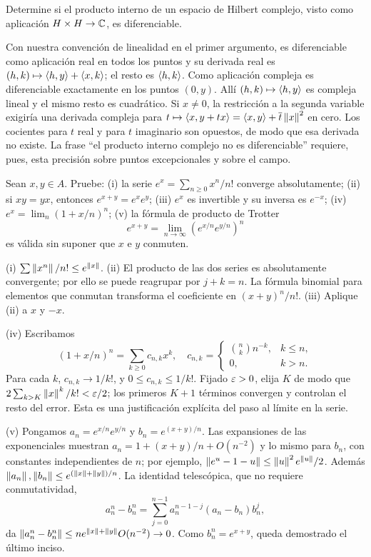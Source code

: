 \begin{ejercicio}\label{ej:v3-l21-2}
Determine si el producto interno de un espacio de Hilbert complejo, visto como aplicación $H\times H\to\mathbb C$, es diferenciable.
\end{ejercicio}
\begin{solucion}
Con nuestra convención de linealidad en el primer argumento, es diferenciable como aplicación real en todos los puntos y su derivada real es $(h,k)\mapsto\left\langle h,y\right\rangle+\left\langle x,k\right\rangle$; el resto es $\left\langle h,k\right\rangle$. Como aplicación compleja es diferenciable exactamente en los puntos $(0,y)$. Allí $(h,k)\mapsto\left\langle h,y\right\rangle$ es compleja lineal y el mismo resto es cuadrático. Si $x\ne0$, la restricción a la segunda variable exigiría una derivada compleja para $t\mapsto\left\langle x,y+tx\right\rangle=\left\langle x,y\right\rangle+\overline t\left\lVert x\right\rVert^2$ en cero. Los cocientes para $t$ real y para $t$ imaginario son opuestos, de modo que esa derivada no existe. La frase ``el producto interno complejo no es diferenciable'' requiere, pues, esta precisión sobre puntos excepcionales y sobre el campo.
\end{solucion}

\begin{ejercicio}\label{ej:v3-l21-3}
Sean $x,y\in A$. Pruebe: (i) la serie $e^x=\sum_{n\ge0}x^n/n!$ converge absolutamente; (ii) si $xy=yx$, entonces $e^{x+y}=e^xe^y$; (iii) $e^x$ es invertible y su inversa es $e^{-x}$; (iv) $e^x=\lim_n(1+x/n)^n$; (v) la fórmula de producto de Trotter
\[
 e^{x+y}=\lim_{n\to\infty}(e^{x/n}e^{y/n})^n
\]
es válida sin suponer que $x$ e $y$ conmuten.
\end{ejercicio}
\begin{solucion}
(i) $\sum\left\lVert x^n\right\rVert/n!\le e^{\left\lVert x\right\rVert}$. (ii) El producto de las dos series es absolutamente convergente; por ello se puede reagrupar por $j+k=n$. La fórmula binomial para elementos que conmutan transforma el coeficiente en $(x+y)^n/n!$. (iii) Aplique (ii) a $x$ y $-x$.

(iv) Escribamos
\[
 (1+x/n)^n=\sum_{k\ge0}c_{n,k}x^k,
 \quad c_{n,k}=\begin{cases}\binom nk n^{-k},&k\le n,\\0,&k>n.\end{cases}
\]
Para cada $k$, $c_{n,k}\to1/k!$, y $0\le c_{n,k}\le1/k!$. Fijado $\varepsilon>0$, elija $K$ de modo que $2\sum_{k>K}\left\lVert x\right\rVert^k/k!<\varepsilon/2$; los primeros $K+1$ términos convergen y controlan el resto del error. Esta es una justificación explícita del paso al límite en la serie.

(v) Pongamos $a_n=e^{x/n}e^{y/n}$ y $b_n=e^{(x+y)/n}$. Las expansiones de las exponenciales muestran $a_n=1+(x+y)/n+O(n^{-2})$ y lo mismo para $b_n$, con constantes independientes de $n$; por ejemplo, $\left\lVert e^u-1-u\right\rVert\le\left\lVert u\right\rVert^2e^{\left\lVert u\right\rVert}/2$. Además $\left\lVert a_n\right\rVert,\left\lVert b_n\right\rVert\le e^{(\left\lVert x\right\rVert+\left\lVert y\right\rVert)/n}$. La identidad telescópica, que no requiere conmutatividad,
\[
 a_n^n-b_n^n=\sum_{j=0}^{n-1}a_n^{n-1-j}(a_n-b_n)b_n^j,
\]
da $\left\lVert a_n^n-b_n^n\right\rVert\le n e^{\left\lVert x\right\rVert+\left\lVert y\right\rVert}O(n^{-2})\to0$. Como $b_n^n=e^{x+y}$, queda demostrado el último inciso.
\end{solucion}

